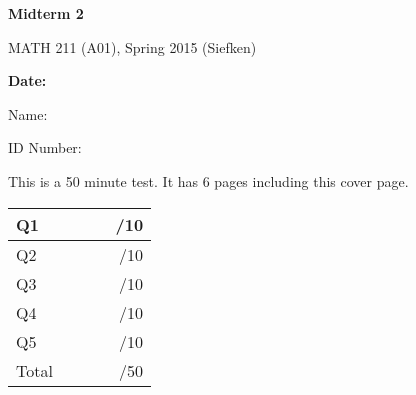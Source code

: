 \documentclass{article}
\begin{document}
	
	{\huge \bf Midterm 2} 
	
	\vspace{2em}
	{\huge MATH 211 (A01), Spring 2015 (Siefken)}
	
	\vspace{2em}
 	{
	\hfill \bf Date: \underline{\hspace{6em}}
	\vspace{.5em}

	\hfill Name: \underline{\hspace{16em}}
	\vspace{.5em}

	\hfill ID Number: \underline{\hspace{16em}}
	
	}

	\vspace{2in}
	This is a 50 minute test. It has 6 pages including this cover page.
	\begin{center}
	\begin{tabular}{|l|c|r|}
	\hline
	Q1 & $\phantom{abcd}$ & /10\\
	\hline
	Q2 & & /10\\
	\hline
	Q3 & & /10\\
	\hline
	Q4 & & /10\\
	\hline
	Q5 & & /10\\
	\hline
	\hline
	Total & & /50\\
	\hline
	\end{tabular}
	\end{center}
	\clearpage
\end{document}
